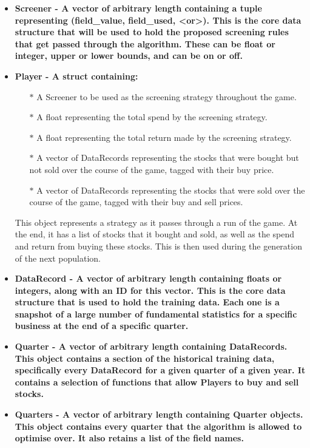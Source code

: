 \begin{itemize}
    \item \bf Screener \rm - A vector of arbitrary length containing a tuple representing (field\_value, field\_used, \textless or\textgreater). This is the core data structure that will be used to hold the proposed screening rules that get passed through the algorithm. These can be float or integer, upper or lower bounds, and can be on or off.
    \item \bf Player \rm - A struct containing:
    \begin{itemize}
        \item[$\ast$] A Screener to be used as the screening strategy throughout the game.
        \item[$\ast$] A float representing the total spend by the screening strategy.
        \item[$\ast$] A float representing the total return made by the screening strategy.
        \item[$\ast$] A vector of DataRecords representing the stocks that were bought but not sold over the course of the game, tagged with their buy price.
        \item[$\ast$] A vector of DataRecords representing the stocks that were sold over the course of the game, tagged with their buy and sell prices.
    \end{itemize}
    This object represents a strategy as it passes through a run of the game. At the end, it has a list of stocks that it bought and sold, as well as the spend and return from buying these stocks. This is then used during the generation of the next population.
    \item \bf DataRecord \rm - A vector of arbitrary length containing floats or integers, along with an ID for this vector. This is the core data structure that is used to hold the training data. Each one is a snapshot of a large number of fundamental statistics for a specific business at the end of a specific quarter.
    \item \bf Quarter \rm - A vector of arbitrary length containing DataRecords. This object contains a section of the historical training data, specifically every DataRecord for a given quarter of a given year. It contains a selection of functions that allow Players to buy and sell stocks.
    \item \bf Quarters \rm - A vector of arbitrary length containing Quarter objects. This object contains every quarter that the algorithm is allowed to optimise over. It also retains a list of the field names.

\end{itemize}
